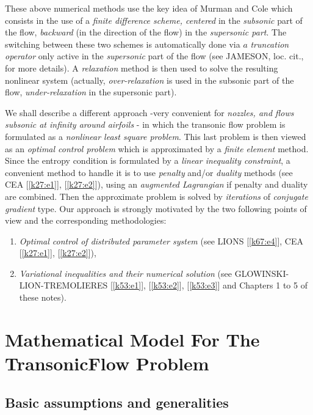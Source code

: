 These above numerical methods use the key idea of Murman and Cole which 
consists in the use of a \textit{finite difference scheme, centered} in 
the  \textit{subsonic} part of the flow,  \textit{backward} (in the 
direction of the flow) in the \textit{supersonic part}. The switching 
between these two schemes is automatically done via $a$ 
\textit{truncation operator} only active in the \textit{supersonic} 
part of the flow (see JAMESON, loc. cit., for more details). A 
\textit{relaxation} method is then used to solve the resulting 
nonlinear system (actually, \textit{over-relaxation} is used in the 
subsonic part of the flow, \textit{under-relaxation} in the supersonic 
part).           

We shall describe a different approach -very convenient for 
\textit{nozzles,  and flows subsonic at infinity around airfoils} - in 
which the transonic flow problem is formulated as a \textit{nonlinear 
least square problem}.  This  last problem is then viewed as an 
\textit{optimal control problem} which  is approximated by a 
\textit{finite element} method.  Since the entropy  condition is 
formulated by a \textit{linear inequality constraint}, a convenient 
method to handle it is to use \textit{penalty} and/or \textit{duality} 
methods (see CEA [\ref{k27:e1}], [\ref{k27:e2}]),  using an
\textit{augmented Lagrangian} if  
penalty and duality are combined. Then the approximate problem is 
solved by \textit{iterations} of \textit{conjugate gradient} type.  Our 
approach is strongly  motivated by the two following points of view and 
the corresponding  methodologies:              
\begin{enumerate}[(1)]
 \item \textit{Optimal control of distributed parameter system }(see 
 LIONS [\ref{k67:e4}], CEA [\ref{k27:e1}], [\ref{k27:e2}]),   
 \item \textit{Variational inequalities and their numerical  solution} 
 (see  GLOWI\-NSKI-LION-TREMOLIERES [\ref{k53:e1}], [\ref{k53:e2}],
   [\ref{k53:e3}] and Chapters 1 to 5 of these notes).   
\end{enumerate}

\section[Mathematical Model For The Transonic...]{Mathematical Model
  For The Transonic\hfil\break Flow Problem}\label{c6:s3} %

\subsection{Basic assumptions and generalities}\label{c6:ss3.1}%

